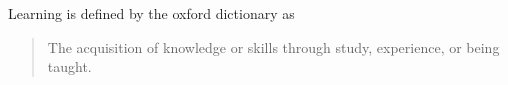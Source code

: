 \documentclass[../Master.tex]{subfiles}
\begin{document}
	
	Learning is defined by the oxford dictionary as 
	\begin{quotation}
		The acquisition of knowledge or skills through study, experience, or being taught.
	\end{quotation}
	
	
	
\end{document}
